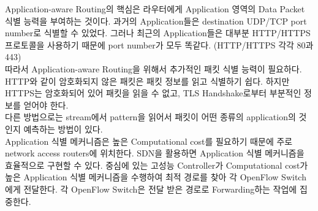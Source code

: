     Application-aware Routing의 핵심은 라우터에게 Application 영역의 Data Packet 식별 능력을 부여하는 것이다. 과거의 Application들은 destination UDP/TCP port number로 식별할 수 있었다. 그러나 최근의 Application들은 대부분 HTTP/HTTPS 프로토콜을 사용하기 때문에 port number가 모두 똑같다. (HTTP/HTTPS 각각 80과 443) \\
    따라서 Application-aware Routing을 위해서 추가적인 패킷 식별 능력이 필요하다. HTTP와 같이 암호화되지 않은 패킷은 패킷 정보를 읽고 식별하기 쉽다. 하지만 HTTPS는 암호화되어 있어 패킷을 읽을 수 없고, TLS Handshake로부터 부분적인 정보를 얻어야 한다. \\
    다른 방법으로는 stream에서 pattern을 읽어서 패킷이 어떤 종류의 application의 것인지 예측하는 방법이 있다. \\
    Application 식별 메커니즘은 높은 Computational cost를 필요하기 때문에 주로 network access routers에 위치한다. SDN을 활용하면 Application 식별 메커니즘을 효율적으로 구현할 수 있다. 중심에 있는 고성능 Controller가 Computational cost가 높은 Application 식별 메커니즘을 수행하여 최적 경로를 찾아 각 OpenFlow Switch에게 전달한다. 각 OpenFlow Switch은 전달 받은 경로로 Forwarding하는 작업에 집중한다. \\
